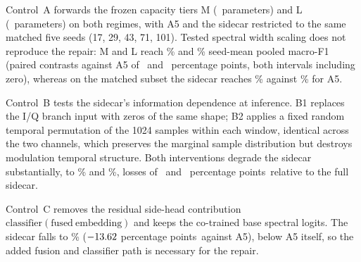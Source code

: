 \documentclass[letterpaper,onecolumn,11pt,journal]{IEEEtran}
\newcommand{\pp}{percentage points}
\begin{document}
Control~A forwards the frozen capacity tiers M (\CapacityMParameters\
parameters) and L (\CapacityLParameters\ parameters) on both regimes, with
A5 and the sidecar restricted to the same matched five seeds
(17, 29, 43, 71, 101). Tested spectral width scaling does not reproduce the
repair: M and L reach \SevereControlLevelCapM\% and \SevereControlLevelCapL\%
seed-mean pooled macro-F1 (paired contrasts against A5 of
\SevereControlDiffCapM\ and \SevereControlDiffCapL\ \pp, both intervals
including zero), whereas on the matched subset the sidecar reaches
\SevereControlMatchedLevelSidecar\% against
\SevereControlMatchedLevelAFive\% for A5.

Control~B tests the sidecar's information dependence at inference. B1
replaces the I/Q branch input with zeros of the same shape; B2 applies a
fixed random temporal permutation of the 1024 samples within each window,
identical across the two channels, which preserves the marginal sample
distribution but destroys modulation temporal structure. Both interventions
degrade the sidecar substantially, to \SevereControlLevelIqZero\% and
\SevereControlLevelIqShuffle\%, losses of \SevereControlIqZeroLoss\ and
\SevereControlIqShuffleLoss\ \pp\ relative to the full sidecar.

Control~C removes the residual side-head contribution
$\mathrm{classifier}(\mathrm{fused\ embedding})$ and keeps the co-trained
base spectral logits. The sidecar falls to \SevereControlLevelNoSideHead\%
($-13.62$ \pp\ against A5), below A5 itself, so the
added fusion and classifier path is necessary for the repair.
\end{document}
